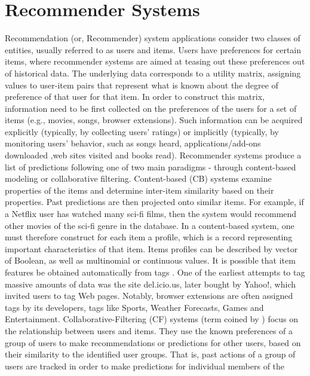 \documentclass[11pt,oneside]{book}
\let\Oldsection\section
\renewcommand{\section}{\FloatBarrier\Oldsection}
\begin{document}
\section{Recommender Systems}

Recommendation (or, Recommender) system applications \citep{resnick1997recommender} consider two
classes of entities, usually referred to as users and items. Users
have preferences for certain items, where recommender systems are
aimed at teasing out these preferences out of historical data. The
underlying data corresponds to a utility matrix, assigning values to
user-item pairs that represent what is known about the degree of
preference of that user for that item. In order to construct this
matrix, information need to be first collected on the preferences of
the users for a set of items (e.g., movies, songs, browser
extensions). Such information can be acquired explicitly (typically,
by collecting users’ ratings) or implicitly (typically, by
monitoring users’ behavior, such as songs heard, applications/add-ons
downloaded ,web sites visited and books read).  Recommender systems
produce a list of predictions following one of two main paradigms -
through content-based modeling or collaborative
filtering. Content-based (CB) systems examine properties of the items
and determine inter-item similarity based on their properties. Past
predictions are then projected onto similar items. For example, if a
Netflix user has watched many sci-fi films, then the system would
recommend other movies of the sci-fi genre in the database. In a
content-based system, one must therefore construct for each item a
profile, which is a record representing important characteristics of
that item. Items profiles can be described by vector of Boolean, as
well as multinomial or continuous values. It is possible that item
features be obtained automatically from tags \citep{golder2006usage}. One of the earliest
attempts to tag massive amounts of data was the site del.icio.us,
later bought by Yahoo!, which invited users to tag Web pages. Notably,
browser extensions are often assigned tags by its developers, tags
like Sports, Weather Forecasts, Games and Entertainment.
Collaborative-Filtering (CF) systems (term coined by \citep{goldberg1992using}) focus on the relationship between users and items. They
use the known preferences of a group of users to make recommendations
or predictions for other users, based on their similarity to the
identified user groups. That is, past actions of a group of users are
tracked in order to make predictions for individual members of the
\end{document}
